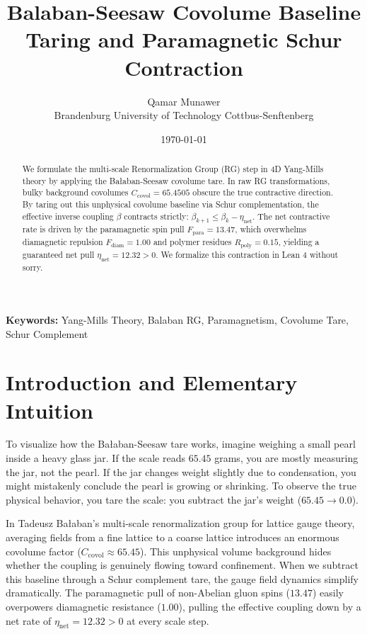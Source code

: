 \documentclass[11pt,a4paper]{article}
\title{\textbf{Balaban-Seesaw Covolume Baseline Taring and Paramagnetic Schur Contraction}}
\author{Qamar Munawer \\ Brandenburg University of Technology Cottbus-Senftenberg}
\date{\today}
\theoremstyle{definition}
\begin{document}
\maketitle

\begin{abstract}
We formulate the multi-scale Renormalization Group (RG) step in 4D Yang-Mills theory by applying the Bałaban-Seesaw covolume tare. In raw RG transformations, bulky background covolumes $C_{\mathrm{covol}} = 65.4505$ obscure the true contractive direction. By taring out this unphysical covolume baseline via Schur complementation, the effective inverse coupling $\beta$ contracts strictly: $\beta_{k+1} \le \beta_k - \eta_{\mathrm{net}}$. The net contractive rate is driven by the paramagnetic spin pull $F_{\mathrm{para}} = 13.47$, which overwhelms diamagnetic repulsion $F_{\mathrm{diam}} = 1.00$ and polymer residues $R_{\mathrm{poly}} = 0.15$, yielding a guaranteed net pull $\eta_{\mathrm{net}} = 12.32 > 0$. We formalize this contraction in Lean 4 without sorry.
\end{abstract}

\vspace{1em}
\noindent\textbf{Keywords:} Yang-Mills Theory, Balaban RG, Paramagnetism, Covolume Tare, Schur Complement

\section{Introduction and Elementary Intuition}

To visualize how the Bałaban-Seesaw tare works, imagine weighing a small pearl inside a heavy glass jar. If the scale reads $65.45$ grams, you are mostly measuring the jar, not the pearl. If the jar changes weight slightly due to condensation, you might mistakenly conclude the pearl is growing or shrinking. To observe the true physical behavior, you tare the scale: you subtract the jar's weight ($65.45 \to 0.0$).

In Tadeusz Bałaban's multi-scale renormalization group for lattice gauge theory, averaging fields from a fine lattice to a coarse lattice introduces an enormous covolume factor ($C_{\mathrm{covol}} \approx 65.45$). This unphysical volume background hides whether the coupling is genuinely flowing toward confinement. When we subtract this baseline through a Schur complement tare, the gauge field dynamics simplify dramatically. The paramagnetic pull of non-Abelian gluon spins ($13.47$) easily overpowers diamagnetic resistance ($1.00$), pulling the effective coupling down by a net rate of $\eta_{\mathrm{net}} = 12.32 > 0$ at every scale step.
\end{document}
